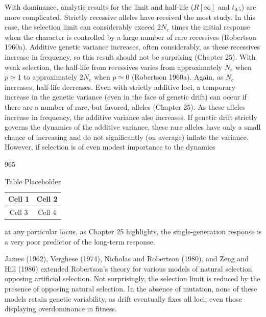 \documentclass{article}
\begin{document}
With dominance, analytic results for the limit and half-life ($R[\infty]$ and $t_{0.5}$) are more complicated. Strictly recessive alleles have received the most study. In this case, the selection limit can considerably exceed $2N_{e}$ times the initial response when the character is controlled by a large number of rare recessives (Robertson 1960a). Additive genetic variance increases, often considerably, as these recessives increase in frequency, so this result should not be surprising (Chapter 25). With weak selection, the half-life from recessives varies from approximately $N_{e}$ when $p\simeq1$ to approximately $2N_{e}$ when $p\simeq0$ (Robertson 1960a). Again, as $N_{e}$ increases, half-life decreases. Even with strictly additive loci, a temporary increase in the genetic variance (even in the face of genetic drift) can occur if there are a number of rare, but favored, alleles (Chapter 25). As these alleles increase in frequency, the additive variance also increases. If genetic drift strictly governs the dynamics of the additive variance, these rare alleles have only a small chance of increasing and do not significantly (on average) inflate the variance. However, if selection is of even modest importance to the dynamics

965

\begin{table}[h]
\centering
\begin{tabular}{|c|c|}
\hline
Cell 1 & Cell 2 \\
\hline
Cell 3 & Cell 4 \\
\hline
\end{tabular}
\caption{Table Placeholder}
\end{table}

at any particular locus, as Chapter 25 highlights, the single-generation response is a very poor predictor of the long-term response.

James (1962), Verghese (1974), Nicholas and Robertson (1980), and Zeng and Hill (1986) extended Robertson's theory for various models of natural selection opposing artificial selection. Not surprisingly, the selection limit is reduced by the presence of opposing natural selection. In the absence of mutation, none of these models retain genetic variability, as drift eventually fixes all loci, even those displaying overdominance in fitness.
\end{document}
